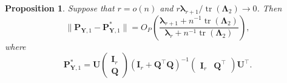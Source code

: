 \documentclass[10pt]{book}
\newtheorem{proposition}{Proposition}
\theoremstyle{definition}
\DeclareMathOperator{\mytr}{tr}
\newcommand{\bQ}{\mathbf{Q}}
\newcommand{\bP}{\mathbf{P}}
\newcommand{\bY}{\mathbf{Y}}
\newcommand{\bI}{\mathbf{I}}
\newcommand{\bU}{\mathbf{U}}
\newcommand{\bfsym}[1]{\ensuremath{\boldsymbol{#1}}}
\def\blambda {\bfsym {\lambda}}
\def\bLambda {\bfsym {\Lambda}}
\begin{document}
\setcounter{proposition}{5}
\begin{proposition}\label{newEigenvectorProp}
    Suppose that $r=o(n)$ and $r\blambda_{r+1} /\mytr(\bLambda_2)\to 0$. Then
    \begin{equation*}
        \|\bP_{\bY,1} -\bP_{\bY,1}^* \|
        =O_P\left(\frac{\blambda_{r+1}+n^{-1}\mytr(\bLambda_2)}{\blambda_r +n^{-1}\mytr(\bLambda_2)}\right),
    \end{equation*}
    where
    \begin{equation*}
        \bP_{\bY,1}^*=
    \bU
    \begin{pmatrix}
       \bI_r \\
       \bQ
    \end{pmatrix}
    \left(\bI_r+ \bQ^\top \bQ \right)^{-1}
    \begin{pmatrix}
        \bI_r
          &
          \bQ^\top
        \end{pmatrix}
        \bU^\top.
    \end{equation*}
\end{proposition}
\end{document}
